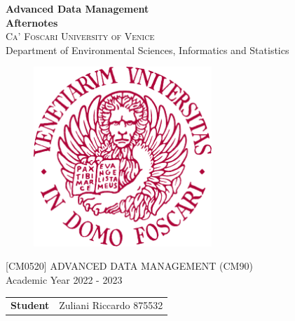 \begin{titlepage}
    \vspace*{1 cm}
    \begin{center}
         {\LARGE \textbf{Advanced Data Management \\Afternotes}\\}
        \vspace{2 cm}
        \textsc{Ca' Foscari University of Venice}\\
        Department of Environmental Sciences, Informatics and Statistics\\
        \vspace{0.2 cm}
        \begin{figure}[h!]
        	\centering
        	\includegraphics[width=0.6\textwidth]{logo} 
        \end{figure}
        \vspace{0.0 cm} [CM0520] ADVANCED DATA MANAGEMENT (CM90)\\
        Academic Year 2022 - 2023\\
        \vspace{3.0 cm}
        	
        \begin{flushleft}
        	\begin{tabular}{l l}
        		\textbf{Student} & Zuliani Riccardo 875532\\
        	\end{tabular}
        \end{flushleft}
    \end{center}
\end{titlepage}
